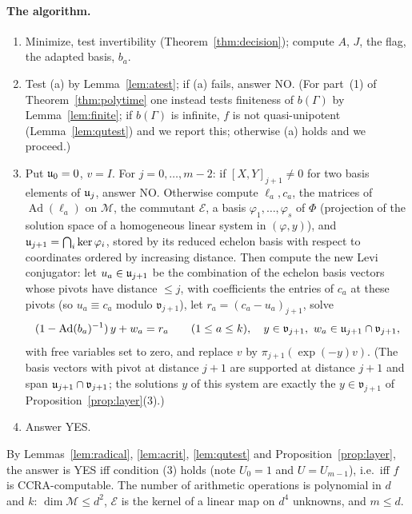 \paragraph{The algorithm.}
\begin{enumerate}
\item Minimize, test invertibility (Theorem~\ref{thm:decision}); compute $A$, $J$, the flag, the
adapted basis, $b_a$.
\item Test (a) by Lemma~\ref{lem:atest}; if (a) fails, answer NO. (For part~(1) of
Theorem~\ref{thm:polytime} one instead tests finiteness of $b(\Gamma)$ by Lemma~\ref{lem:finite}; if
$b(\Gamma)$ is infinite, $f$ is not quasi-unipotent (Lemma~\ref{lem:qutest}) and we report this; otherwise
(a) holds and we proceed.)
\item Put $\mathfrak{u}_0=0$, $v=I$. For $j=0,\ldots,m-2$: if $[X,Y]_{j+1}\ne0$ for two basis elements of
$\mathfrak{u}_j$, answer NO. Otherwise compute $\ell_a,c_a$, the matrices of $\operatorname{Ad}(\ell_a)$ on
$\mathcal M$, the commutant $\mathcal E$, a basis $\varphi_1,\ldots,\varphi_s$ of $\Phi$ (projection of
the solution space of a homogeneous linear system in $(\varphi,y)$), and
$\mathfrak{u}_{j+1}=\bigcap_i\ker\varphi_i$, stored by its reduced echelon basis with respect to coordinates
ordered by increasing distance. Then compute the new Levi conjugator: let $u_a\in\mathfrak{u}_{j+1}$ be the
combination of the echelon basis vectors whose pivots have distance $\le j$, with coefficients the
entries of $c_a$ at these pivots (so $u_a\equiv c_a$ modulo $\mathfrak v_{j+1}$), let
$r_a=(c_a-u_a)_{j+1}$, solve
\[
(1-\operatorname{Ad}(b_a)^{-1})\,y+w_a=r_a\qquad(1\le a\le k),\quad y\in\mathfrak v_{j+1},\
w_a\in\mathfrak{u}_{j+1}\cap\mathfrak v_{j+1},
\]
with free variables set to zero, and replace $v$ by $\pi_{j+1}(\exp(-y)v)$. (The basis vectors with pivot
at distance $j+1$ are supported at distance $j+1$ and span $\mathfrak{u}_{j+1}\cap\mathfrak v_{j+1}$; the solutions
$y$ of this system are exactly the $y\in\mathfrak v_{j+1}$ of Proposition~\ref{prop:layer}(3).)
\item Answer YES.
\end{enumerate}
By Lemmas~\ref{lem:radical}, \ref{lem:acrit}, \ref{lem:qutest} and Proposition~\ref{prop:layer}, the
answer is YES iff condition (3) holds (note $U_0=1$ and $U=U_{m-1}$), i.e.\ iff $f$ is
CCRA-computable. The number of arithmetic operations is polynomial in $d$ and $k$:
$\dim\mathcal M\le d^2$, $\mathcal E$ is the kernel of a linear map on $d^4$ unknowns, and $m\le d$.

